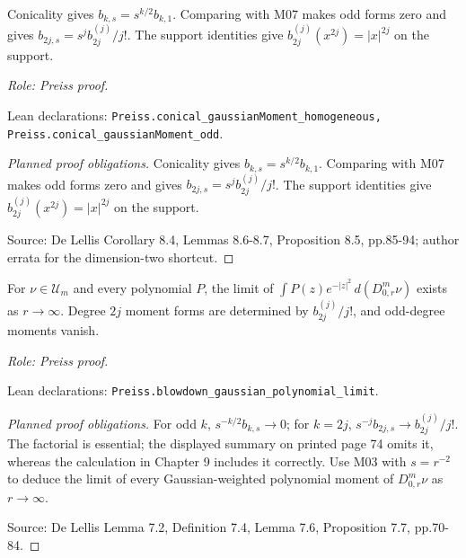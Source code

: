 \begin{lemma}
\label{lem:conical-moments}




Conicality gives $b_{k,s}=s^{k/2}b_{k,1}$. Comparing with M07 makes odd forms
zero and gives $b_{2j,s}=s^j b_{2j}^{(j)}/j!$.
The support identities give $b_{2j}^{(j)}(x^{2j})=|x|^{2j}$ on the support.
\par\emph{Role: Preiss proof.}
\par Lean declarations: \texttt{Preiss.conical\_gaussianMoment\_homogeneous, Preiss.conical\_gaussianMoment\_odd}.
\end{lemma}
\begin{proof}[Planned proof obligations]

Conicality gives $b_{k,s}=s^{k/2}b_{k,1}$. Comparing with M07 makes odd forms
zero and gives $b_{2j,s}=s^j b_{2j}^{(j)}/j!$.
The support identities give $b_{2j}^{(j)}(x^{2j})=|x|^{2j}$ on the support.
\par Source: De Lellis Corollary 8.4, Lemmas 8.6-8.7, Proposition 8.5, pp.85-94; author errata for the dimension-two shortcut.
\end{proof}

\begin{lemma}
\label{lem:blowdown-moment-limits}




For $\nu\in\mathcal U_m$ and every polynomial $P$, the limit of $\int P(z)e^{-|z|^2}\,d(D^m_{0,r}\nu)$ exists as $r\to\infty$. Degree $2j$ moment forms are determined by $b_{2j}^{(j)}/j!$, and odd-degree moments vanish.
\par\emph{Role: Preiss proof.}
\par Lean declarations: \texttt{Preiss.blowdown\_gaussian\_polynomial\_limit}.
\end{lemma}
\begin{proof}[Planned proof obligations]

For odd $k$, $s^{-k/2}b_{k,s}\to0$; for $k=2j$,
$s^{-j}b_{2j,s}\to b_{2j}^{(j)}/j!$.
The factorial is essential; the displayed summary on printed page 74 omits it,
whereas the calculation in Chapter 9 includes it correctly.
Use M03 with $s=r^{-2}$ to deduce the limit of every Gaussian-weighted
polynomial moment of $D^m_{0,r}\nu$ as $r\to\infty$.
\par Source: De Lellis Lemma 7.2, Definition 7.4, Lemma 7.6, Proposition 7.7, pp.70-84.
\end{proof}

